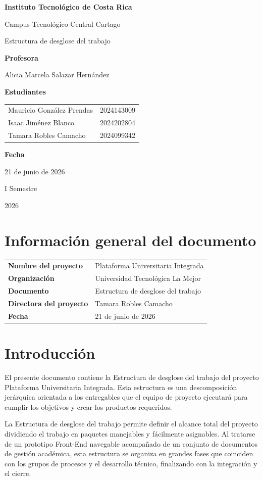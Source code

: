 \documentclass[11pt,spanish]{article}
\title{\DocumentoTitulo}
\author{\AutoresPortada}
\date{\FechaDocumento}
\makeatletter
\newcommand{\Institucion}{Instituto Tecnológico de Costa Rica}
\newcommand{\Campus}{Campus Tecnológico Central Cartago}
\newcommand{\DocumentoTitulo}{Estructura de desglose del trabajo}
\newcommand{\Profesor}{Alicia Marcela Salazar Hernández}
\newcommand{\FechaDocumento}{21 de junio de 2026}
\newcommand{\PeriodoAcademico}{I Semestre}
\newcommand{\AnioDocumento}{2026}
\newcommand{\AutoresPortada}{%
    \begin{tabular}{l@{\hspace{1.5cm}}r}
        Mauricio González Prendas & 2024143009 \\
        Isaac Jiménez Blanco & 2024202804 \\
        Tamara Robles Camacho & 2024099342 \\
    \end{tabular}%
}
\newcommand{\MakeCover}{%
\begin{titlepage}
\thispagestyle{empty}
\centering

{\bfseries \huge \Institucion \par}
\vspace{0.25cm}
{\LARGE \Campus \par}

\vfill

{\huge \DocumentoTitulo \par}

\vfill

{\bfseries \LARGE Profesora \par}
{\Large \Profesor \par}

\vfill

{\bfseries \LARGE Estudiantes \par}
{\Large \AutoresPortada \par}

\vfill

{\bfseries\LARGE Fecha \par}
{\Large \FechaDocumento \par}

\vfill

{\LARGE \PeriodoAcademico \par}
{\LARGE \AnioDocumento \par}

\end{titlepage}%
}
\makeatother
\begin{document}
\hypersetup{pageanchor=false}

\MakeCover

\pagestyle{empty}
\tableofcontents
\clearpage
{}
\hypersetup{pageanchor=true}
\pagestyle{fancy}


\section{Información general del documento}

\begin{table}[H]
\centering
\begin{tabularx}{\textwidth}{p{5cm} Y}
\toprule
\textbf{Nombre del proyecto} & Plataforma Universitaria Integrada \\
\textbf{Organización} & Universidad Tecnológica La Mejor \\
\textbf{Documento} & \DocumentoTitulo \\
\textbf{Directora del proyecto} & Tamara Robles Camacho \\
\textbf{Fecha} & \FechaDocumento \\
\bottomrule
\end{tabularx}
\end{table}

\section{Introducción}

El presente documento contiene la Estructura de desglose del trabajo del proyecto Plataforma Universitaria Integrada. Esta estructura es una descomposición jerárquica orientada a los entregables que el equipo de proyecto ejecutará para cumplir los objetivos y crear los productos requeridos.

La Estructura de desglose del trabajo permite definir el alcance total del proyecto dividiendo el trabajo en paquetes manejables y fácilmente asignables. Al tratarse de un prototipo Front-End navegable acompañado de un conjunto de documentos de gestión académica, esta estructura se organiza en grandes fases que coinciden con los grupos de procesos y el desarrollo técnico, finalizando con la integración y el cierre.
\end{document}
